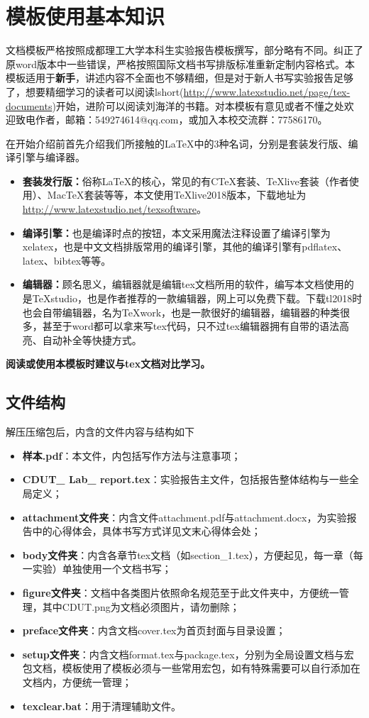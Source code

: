 \section{模板使用基本知识}
文档模板严格按照成都理工大学本科生实验报告模板撰写，部分略有不同。纠正了原word版本中一些错误，严格按照国际文档书写排版标准重新定制内容格式。本模板适用于\textbf{新手}，讲述内容不全面也不够精细，但是对于新人书写实验报告足够了，想要精细学习的读者可以阅读lshort(\url{http://www.latexstudio.net/page/tex-documents})开始，进阶可以阅读刘海洋的书籍。对本模板有意见或者不懂之处欢迎致电作者，邮箱：549274614@qq.com，或加入本校交流群：77586170。

在开始介绍前首先介绍我们所接触的\LaTeX 中的3种名词，分别是套装发行版、编译引擎与编译器。
\begin{itemize}
\item \textbf{套装发行版：}俗称\LaTeX 的核心，常见的有CTeX套装、TeXlive套装（作者使用）、MacTeX套装等等，本文使用TeXlive2018版本，下载地址为\url{http://www.latexstudio.net/texsoftware}。

\item \textbf{编译引擎：}也是编译时点的按钮，本文采用魔法注释设置了编译引擎为xelatex，也是中文文档排版常用的编译引擎，其他的编译引擎有pdflatex、latex、bibtex等等。
 
\item \textbf{编辑器：}顾名思义，编辑器就是编辑tex文档所用的软件，编写本文档使用的是TeXstudio，也是作者推荐的一款编辑器，网上可以免费下载。下载tl2018时也会自带编辑器，名为TeXwork，也是一款很好的编辑器，编辑器的种类很多，甚至于word都可以拿来写tex代码，只不过tex编辑器拥有自带的语法高亮、自动补全等快捷方式。
\end{itemize}

\textbf{阅读或使用本模板时建议与tex文档对比学习。}
\subsection{文件结构}
解压压缩包后，内含的文件内容与结构如下
\begin{itemize}
\item \textbf{样本.pdf}：本文件，内包括写作方法与注意事项；
\item \textbf{CDUT\_ Lab\_ report.tex}：实验报告主文件，包括报告整体结构与一些全局定义；
\item \textbf{attachment文件夹}：内含文件attachment.pdf与attachment.docx，为实验报告中的心得体会，具体书写方式详见文末心得体会处；
\item \textbf{body文件夹}：内含各章节tex文档（如section\_1.tex），方便起见，每一章（每一实验）单独使用一个文档书写；
\item \textbf{figure文件夹}：文档中各类图片依照命名规范至于此文件夹中，方便统一管理，其中CDUT.png为文档必须图片，请勿删除；
\item \textbf{preface文件夹}：内含文档cover.tex为首页封面与目录设置；
\item \textbf{setup文件夹}：内含文档format.tex与package.tex，分别为全局设置文档与宏包文档，模板使用了模板必须与一些常用宏包，如有特殊需要可以自行添加在文档内，方便统一管理；
\item \textbf{texclear.bat}：用于清理辅助文件。
\end{itemize}
